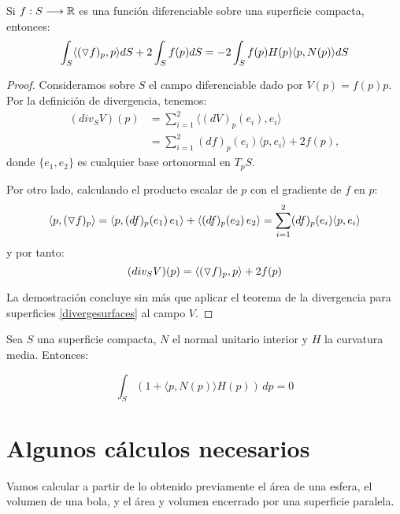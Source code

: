 \begin{corolario}\label{corolariogradiente}
Si $f: S \longrightarrow \mathbb{R}$ es una función diferenciable sobre una superficie compacta, entonces:
%
\begin{equation*}
    \int_S \langle (\triangledown f)_p, p \rangle dS + 2 \int_S f(p)dS = -2 \int_S f(p)H(p) \langle p, N(p) \rangle dS
\end{equation*}
\end{corolario}
\begin{proof}
Consideramos sobre $S$ el campo diferenciable dado por $V(p)=f(p)p$. Por la definición de divergencia, tenemos:
%
\begin{align*}
    (div_S V)(p) &= \sum_{i=1}^2 \langle (dV)_p(e_i), e_i \rangle \\
    &= \sum_{i=1}^2 (df)_p(e_i) \langle p, e_i \rangle + 2f(p),
\end{align*}
%
donde $\{e_1,e_2\}$ es cualquier base ortonormal en $T_pS$.

Por otro lado, calculando el producto escalar de $p$ con el gradiente de $f$ en $p$:
%
\begin{equation*}
    \langle p, (\triangledown f)_p \rangle = \langle p, (df)_p(e_1) \, e_1 \rangle + \langle (df)_p(e_2) \, e_2 \rangle = \sum_{i=1}^2 (df)_p(e_i) \langle p, e_i \rangle 
\end{equation*}
%
y por tanto:
%
\begin{equation*}
    (div_S V)(p) = \langle (\triangledown f)_p, p \rangle + 2f(p)
\end{equation*}

La demostración concluye sin más que aplicar el teorema de la divergencia para superficies \ref{divergesurfaces} al campo $V$.
\end{proof}

\begin{theorem}\label{formulaminkowski}
Sea $S$ una superficie compacta, $N$ el normal unitario interior y $H$ la curvatura media. Entonces:

\begin{equation*}
    \int_S (1+ \langle p, N(p) \rangle H(p)) \, dp = 0
\end{equation*}
\end{theorem}

\section{Algunos cálculos necesarios}

Vamos calcular a partir de lo obtenido previamente el área de una esfera, el volumen de una bola, y el área y volumen encerrado por una superficie paralela.

